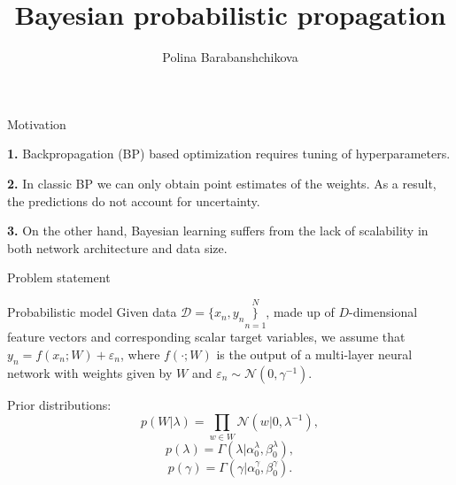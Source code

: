 \documentclass[13pt]{beamer}				\usepackage{graphicx}
\title[Bayesian probabilistic propagation]{Bayesian probabilistic propagation}
\author[Polina Barabanshchikova]{Polina Barabanshchikova}
\institute[MIPT]{MIPT}
\begin{document}
\begin{frame}
  \titlepage
\end{frame}

\begin{frame}{Motivation}

\textbf{1.} Backpropagation (BP) based optimization requires tuning of hyperparameters.

\textbf{2.} In classic BP we can only obtain point estimates of the weights. As a result, the predictions do not account for uncertainty.

\textbf{3.} On the other hand, Bayesian learning suffers from the lack of scalability in both network architecture and data size.

\end{frame}

\begin{frame}{Problem statement}
\begin{block}{Probabilistic model}
Given data $\mathcal{D} = \{x_n, y_n\}\limits_{n = 1}^N $, made up of $D$-dimensional feature vectors and corresponding scalar target variables, we assume that $y_n = f (x_n; W) + \varepsilon_n$, where $f (·; W)$ is the output of a multi-layer neural network with weights given by $W$ and $\varepsilon_n \sim \mathcal{N}(0, \gamma^{-1})$.  

Prior distributions:
$$p(W| \lambda) = \prod \limits_{w \in W} \mathcal{N}(w | 0, \lambda^{-1}),$$
$$p(\lambda) = \Gamma(\lambda| \alpha_0^{\lambda}, \beta_0^{\lambda}),$$
$$p(\gamma) = \Gamma(\gamma| \alpha_0^{\gamma}, \beta_0^{\gamma}).$$
\end{block}
\end{frame}
\end{document}
